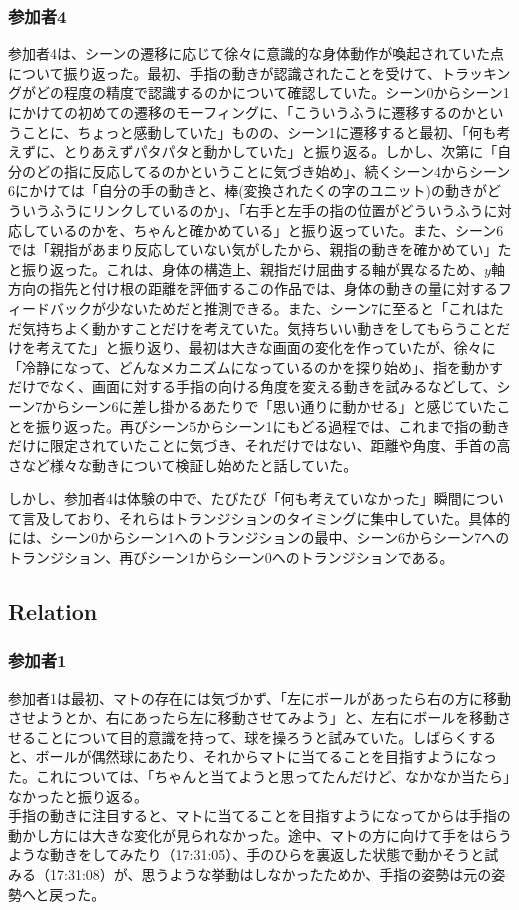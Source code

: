 \subsubsection*{参加者4}
参加者4は、シーンの遷移に応じて徐々に意識的な身体動作が喚起されていた点について振り返った。最初、手指の動きが認識されたことを受けて、トラッキングがどの程度の精度で認識するのかについて確認していた。シーン0からシーン1にかけての初めての遷移のモーフィングに、「こういうふうに遷移するのかということに、ちょっと感動していた」ものの、シーン1に遷移すると最初、「何も考えずに、とりあえずパタパタと動かしていた」と振り返る。しかし、次第に「自分のどの指に反応してるのかということに気づき始め」、続くシーン4からシーン6にかけては「自分の手の動きと、棒(変換されたくの字のユニット)の動きがどういうふうにリンクしているのか」、「右手と左手の指の位置がどういうふうに対応しているのかを、ちゃんと確かめている」と振り返っていた。また、シーン6では「親指があまり反応していない気がしたから、親指の動きを確かめてい」たと振り返った。これは、身体の構造上、親指だけ屈曲する軸が異なるため、\(y\)軸方向の指先と付け根の距離を評価するこの作品では、身体の動きの量に対するフィードバックが少ないためだと推測できる。また、シーン7に至ると「これはただ気持ちよく動かすことだけを考えていた。気持ちいい動きをしてもらうことだけを考えてた」と振り返り、最初は大きな画面の変化を作っていたが、徐々に「冷静になって、どんなメカニズムになっているのかを探り始め」、指を動かすだけでなく、画面に対する手指の向ける角度を変える動きを試みるなどして、シーン7からシーン6に差し掛かるあたりで「思い通りに動かせる」と感じていたことを振り返った。再びシーン5からシーン1にもどる過程では、これまで指の動きだけに限定されていたことに気づき、それだけではない、距離や角度、手首の高さなど様々な動きについて検証し始めたと話していた。

しかし、参加者4は体験の中で、たびたび「何も考えていなかった」瞬間について言及しており、それらはトランジションのタイミングに集中していた。具体的には、シーン0からシーン1へのトランジションの最中、シーン6からシーン7へのトランジション、再びシーン1からシーン0へのトランジションである。

\subsection{Relation}
\subsubsection*{参加者1}
参加者1は最初、マトの存在には気づかず、「左にボールがあったら右の方に移動させようとか、右にあったら左に移動させてみよう」と、左右にボールを移動させることについて目的意識を持って、球を操ろうと試みていた。しばらくすると、ボールが偶然球にあたり、それからマトに当てることを目指すようになった。これについては、「ちゃんと当てようと思ってたんだけど、なかなか当たら」なかったと振り返る。\\
手指の動きに注目すると、マトに当てることを目指すようになってからは手指の動かし方には大きな変化が見られなかった。途中、マトの方に向けて手をはらうような動きをしてみたり（17:31:05）、手のひらを裏返した状態で動かそうと試みる（17:31:08）が、思うような挙動はしなかったためか、手指の姿勢は元の姿勢へと戻った。
